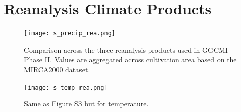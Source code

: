 \documentclass[10pt]{article}
\begin{document}
\clearpage
\section{Reanalysis Climate Products}
\begin{figure}[h!]
    \centering
    \texttt{[image: s\_precip\_rea.png]}
    \caption{Comparison across the three reanalysis products used in GGCMI Phase II. Values are aggregated across cultivation area based on the MIRCA2000 dataset.}
    \label{fig:precip_rea}
\end{figure}

\begin{figure}[h!]
    \centering
    \texttt{[image: s\_temp\_rea.png]}
    \caption{Same as Figure S3 but for temperature.}
    \label{fig:precip_rea}
\end{figure}

\clearpage
\end{document}
